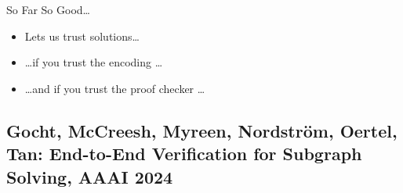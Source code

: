 \documentclass[aspectratio=169,compress,10pt]{beamer}
\begin{document}
\begin{frame}{So Far So Good\ldots}
    \begin{itemize}
        \item Lets us trust solutions\ldots
            \pause
        \item \ldots if you trust the encoding \ldots
            \pause
        \item \ldots and if you trust the proof checker \ldots
    \end{itemize}
\end{frame}

\subsection{Gocht, McCreesh, Myreen, Nordstr\"om, Oertel, Tan: End-to-End Verification for Subgraph Solving, AAAI 2024}
\end{document}
